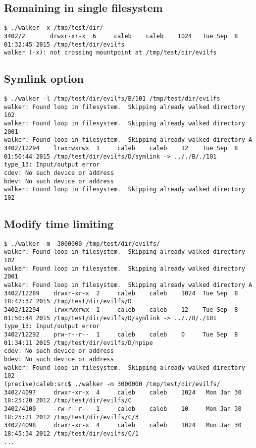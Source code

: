 \documentclass{article}
\begin{document}
\subsection{Remaining in single filesystem}

\begin{lstlisting}
$ ./walker -x /tmp/test/dir/
3402/2       drwxr-xr-x  6     caleb    caleb    1024   Tue Sep  8 01:32:45 2015 /tmp/test/dir/evilfs 
walker (-x): not crossing mountpoint at /tmp/test/dir/evilfs
\end{lstlisting}

\subsection{Symlink option}

\begin{lstlisting}
$ ./walker -l /tmp/test/dir/evilfs/B/101 /tmp/test/dir/evilfs
walker: Found loop in filesystem.  Skipping already walked directory 102
walker: Found loop in filesystem.  Skipping already walked directory 2001
walker: Found loop in filesystem.  Skipping already walked directory A
3402/12294    lrwxrwxrwx  1     caleb    caleb    12    Tue Sep  8 01:50:44 2015 /tmp/test/dir/evilfs/D/symlink -> .././B/./101
type_13: Input/output error
cdev: No such device or address
bdev: No such device or address
walker: Found loop in filesystem.  Skipping already walked directory 102

\end{lstlisting}

\subsection{Modify time limiting}

\begin{lstlisting}
$ ./walker -m -3000000 /tmp/test/dir/evilfs/
walker: Found loop in filesystem.  Skipping already walked directory 102
walker: Found loop in filesystem.  Skipping already walked directory 2001
walker: Found loop in filesystem.  Skipping already walked directory A
3402/12289    drwxr-xr-x  2     caleb    caleb    1024  Tue Sep  8 18:47:37 2015 /tmp/test/dir/evilfs/D 
3402/12294    lrwxrwxrwx  1     caleb    caleb    12    Tue Sep  8 01:50:44 2015 /tmp/test/dir/evilfs/D/symlink -> .././B/./101
type_13: Input/output error
3402/12292    prw-r--r--  1     caleb    caleb    0     Tue Sep  8 01:34:11 2015 /tmp/test/dir/evilfs/D/npipe 
cdev: No such device or address
bdev: No such device or address
walker: Found loop in filesystem.  Skipping already walked directory 102
(precise)caleb:src$ ./walker -m 3000000 /tmp/test/dir/evilfs/
3402/4097     drwxr-xr-x  4     caleb    caleb    1024   Mon Jan 30 18:25:20 2012 /tmp/test/dir/evilfs/C 
3402/4100     -rw-r--r--  1     caleb    caleb    10     Mon Jan 30 18:25:21 2012 /tmp/test/dir/evilfs/C/3 
3402/4098     drwxr-xr-x  4     caleb    caleb    1024   Mon Jan 30 18:45:34 2012 /tmp/test/dir/evilfs/C/1 
...

\end{lstlisting}
\end{document}
